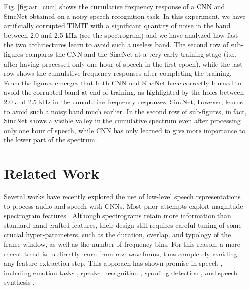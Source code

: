 \documentclass{article}
\begin{document}
\begin{itemize}
Fig. \ref{fig:asr_cum} shows the cumulative frequency response of a CNN and SincNet obtained on a noisy speech recognition task. In this experiment, we have artificially corrupted TIMIT with a significant quantity of noise in the band between 2.0 and 2.5 kHz (see the spectrogram) and we have analyzed how fast the two architectures learn to avoid such a useless band. The second row of sub-figures compares the CNN and the SincNet at a very early training stage (i.e., after having processed only one hour of speech in the first epoch), while the last row shows the cumulative frequency responses after completing the training. From the figures emerges that both CNN and SincNet have correctly learned to avoid the corrupted band at end of training, as highlighted by the holes between 2.0 and 2.5 kHz in the cumulative frequency responses. SincNet, however, learns to avoid such a noisy band much earlier. In the second row of sub-figures, in fact, SincNet shows a visible valley in the cumulative spectrum even after processing only one hour of speech, while CNN has only learned to give more importance to the lower part of the spectrum.  



\end{itemize}

\section{Related Work} \label{sec:rel_work}
Several works have recently explored the use of low-level speech representations to process audio and speech with CNNs. Most prior attempts exploit magnitude spectrogram features \cite{e2e_spk_id,spk_rec_time_freq,voxceleb,tara_asru2013,learn_fbank_const,fbank_par}. Although spectrograms retain more information than standard hand-crafted features, their design still requires careful tuning of some crucial hyper-parameters, such as the duration, overlap, and typology of the frame window, as well as the number of frequency bins. For this reason, a more recent trend is to directly learn from raw waveforms, thus completely avoiding any feature extraction step. 
This approach has shown promise in speech \cite{palaz_raw,tara_raw,google_rawmulti,joint7,tuske}, including emotion tasks \cite{dnn_emotion}, speaker recognition \cite{raw_speaker_id}, spoofing detection \cite{spoofing_raw}, and speech synthesis \cite{wavenet,sample_rnn}.
\end{document}
